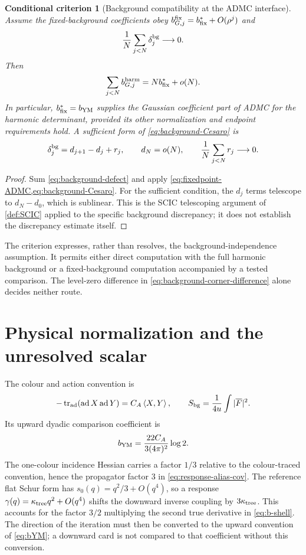 \documentclass[11pt,oneside,openany]{book}
\newtheorem{criterion}[criterion]{Conditional criterion}
\theoremstyle{definition}
\theoremstyle{remark}
\newcommand{\tr}{\operatorname{tr}}
\newcommand{\ip}[2]{\left\langle#1,#2\right\rangle}
\begin{document}
\begin{criterion}[Background compatibility at the ADMC interface]
\label{crit:background-ADMC}
Assume the fixed-background coefficients obey
$b_{G,j}^{\rm fix}=b_{\rm fix}^*+O(\rho^j)$ and
\begin{equation}\label{eq:background-Cesaro}
\frac1N\sum_{j<N}\delta_j^{\rm bg}\longrightarrow0.
\end{equation}
Then
\[
\sum_{j<N}b_{G,j}^{\rm harm}=Nb_{\rm fix}^*+o(N).
\]
In particular, $b_{\rm fix}^*=b_{\rm YM}$ supplies the Gaussian
coefficient part of ADMC for the harmonic determinant, provided its other
normalization and endpoint requirements hold. A sufficient form of
\cref{eq:background-Cesaro} is
\begin{equation}\label{eq:background-coboundary}
\delta_j^{\rm bg}=d_{j+1}-d_j+r_j,\qquad
d_N=o(N),\qquad \frac1N\sum_{j<N}r_j\longrightarrow0.
\end{equation}
\end{criterion}
\begin{proof}
Sum \cref{eq:background-defect} and apply
\cref{eq:fixedpoint-ADMC,eq:background-Cesaro}. For the sufficient
condition, the $d_j$ terms telescope to $d_N-d_0$, which is sublinear.
This is the SCIC telescoping argument of \cref{def:SCIC} applied to the
specific background discrepancy; it does not establish the discrepancy
estimate itself.
\end{proof}

The criterion expresses, rather than resolves, the background-independence
assumption. It permits either direct computation with the full harmonic
background or a fixed-background computation accompanied by a tested
comparison. The level-zero difference in
\cref{eq:background-corner-difference} alone decides neither route.

\section{Physical normalization and the unresolved scalar}
The colour and action convention is
\[
-\tr_{\rm ad}(\operatorname{ad}X\operatorname{ad}Y)=C_A\ip{X}{Y},
\qquad S_{\rm bg}=\frac1{4u}\int|\overline F|^2.
\]
Its upward dyadic comparison coefficient is
\begin{equation}\label{eq:bYM}
b_{\rm YM}=\frac{22C_A}{3(4\pi)^2}\log2.
\end{equation}
The one-colour incidence Hessian carries a factor $1/3$ relative to the
colour-traced convention, hence the propagator factor $3$ in
\cref{eq:response-alias-cov}. The reference flat Schur form has
$s_0(q)=q^2/3+O(q^4)$, so a response
$\gamma(q)=\kappa_{\rm tree}q^2+O(q^4)$ shifts the downward inverse
coupling by $3\kappa_{\rm tree}$. This accounts for the factor $3/2$
multiplying the second true derivative in \cref{eq:b-shell}. The direction
of the iteration must then be converted to the upward convention of
\cref{eq:bYM}; a downward card is not compared to that coefficient without
this conversion.
\end{document}
